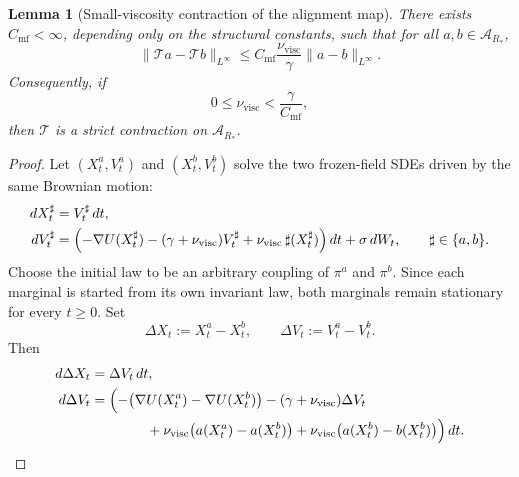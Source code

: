 \documentclass[11pt]{article}
\newtheorem{lemma}[theorem]{Lemma}
\theoremstyle{definition}
\theoremstyle{remark}
\begin{document}
\begin{lemma}[Small-viscosity contraction of the alignment map]\label{lem:mf-map-contraction}
There exists \(C_{\mathrm{mf}}<\infty\), depending only on the structural
constants, such that for all \(a,b\in \mathcal A_{R_*}\),
\[
\|\mathcal T a-\mathcal T b\|_{L^\infty}
\le
C_{\mathrm{mf}}\frac{\nu_{\mathrm{visc}}}{\gamma}\|a-b\|_{L^\infty}.
\]
Consequently, if
\[
0\le \nu_{\mathrm{visc}}<\frac{\gamma}{C_{\mathrm{mf}}},
\]
then \(\mathcal T\) is a strict contraction on \(\mathcal A_{R_*}\).
\end{lemma}

\begin{proof}
Let \((X_t^a,V_t^a)\) and \((X_t^b,V_t^b)\) solve the two frozen-field SDEs
driven by the same Brownian motion:
\begin{align*}
dX_t^\sharp &= V_t^\sharp\,dt,\\
dV_t^\sharp &=
\Bigl(-\nabla U(X_t^\sharp)-(\gamma+\nu_{\mathrm{visc}})V_t^\sharp
+\nu_{\mathrm{visc}}\,\sharp(X_t^\sharp)\Bigr)\,dt
+\sigma\,dW_t,
\qquad
\sharp\in\{a,b\}.
\end{align*}
Choose the initial law to be an arbitrary coupling of \(\pi^a\) and \(\pi^b\).
Since each marginal is started from its own invariant law, both marginals remain
stationary for every \(t\ge0\). Set
\[
\Delta X_t:=X_t^a-X_t^b,
\qquad
\Delta V_t:=V_t^a-V_t^b.
\]
Then
\begin{align*}
d\Delta X_t &= \Delta V_t\,dt,\\
d\Delta V_t
&=
\Bigl(
-\bigl(\nabla U(X_t^a)-\nabla U(X_t^b)\bigr)
-(\gamma+\nu_{\mathrm{visc}})\Delta V_t\\
&\qquad\qquad
+\nu_{\mathrm{visc}}\bigl(a(X_t^a)-a(X_t^b)\bigr)
+\nu_{\mathrm{visc}}\bigl(a(X_t^b)-b(X_t^b)\bigr)
\Bigr)\,dt.
\end{align*}


\end{proof}
\end{document}
